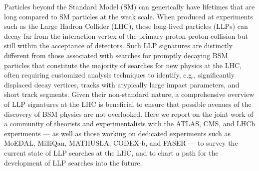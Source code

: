 %
Particles beyond the Standard Model (SM) can generically have lifetimes that are long compared to SM particles at the weak scale.
When produced at experiments such as the Large Hadron Collider (LHC), these long-lived particles (LLPs) can decay far from the interaction vertex of the primary proton-proton collision but still within the acceptance of detectors.
Such LLP signatures are distinctly different from those associated with searches for promptly decaying BSM particles that constitute the majority of searches for new physics at the LHC, often requiring customized analysis techniques to identify, e.g., significantly displaced decay vertices, tracks with atypically large impact parameters, and short track segments.
Given their non-standard nature, a comprehensive overview of LLP signatures at the LHC is beneficial to ensure that possible avenues of the discovery of BSM physics are not overlooked.
Here we report on the joint work of a community of theorists and experimentalists with the ATLAS, CMS, and LHCb experiments --- as well as those working on dedicated experiments such as MoEDAL, MilliQan, MATHUSLA, CODEX-b, and FASER --- to survey the current state of LLP searches at the LHC, and to chart a path for the development of LLP searches into the future.
